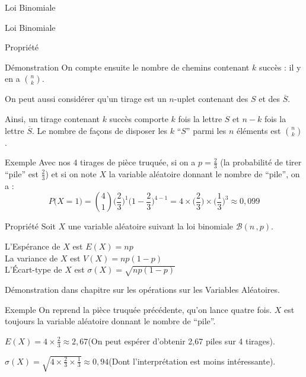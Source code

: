 \documentclass{cours}
\begin{document}
\begin{Gpartie}{Loi Binomiale}
\begin{Spartie}{Loi Binomiale}
\begin{SSpartie}{Propriété}
\begin{SSSpartie}{Démonstration}
                    On compte ensuite le nombre de chemins contenant $k$ succès : il y en a $\binom{n}{k}$.

                    On peut aussi considérer qu'un tirage est un $n$-uplet contenant des $S$ et des $\overline{S}$.

                    Ainsi, un tirage contenant $k$ succès comporte $k$ fois la lettre $S$ et $n-k$ fois la lettre $\overline{S}$. Le nombre de façons de disposer les $k$ ``$S$'' parmi les $n$ éléments est $\binom{n}{k}$.
                \end{SSSpartie}
                \begin{SSSpartie}{Exemple} 
                    Avec nos $4$ tirages de pièce truquée, si on a $p=\frac{2}{3}$ (la probabilité de tirer ``pile'' est $\frac{2}{3}$) et si on note $X$ la variable aléatoire donnant le nombre de ``pile'', on a :
                    \[P\big(X=1\big)=\binom{4}{1}\Bigg(\frac{2}{3}\Bigg)^1\Bigg(1-\frac{2}{3}\Bigg)^{4-1}=4\times\Bigg(\frac{2}{3}\Bigg)\times\Bigg(\frac{1}{3}\Bigg)^3\approx 0{,}099\]
                \end{SSSpartie}
            \end{SSpartie}
            \begin{SSpartie}{Propriété} 
                Soit $X$ une variable aléatoire suivant la loi binomiale $\mathcal{B}(n\,, p)$.

                L'Espérance de $X$ est $E(X)=np$ \\ La variance de $X$ est $V(X)=np(1-p)$ \\ L'Écart-type de $X$ est $\sigma(X)=\sqrt{np(1-p)}$

                Démonstration dans chapitre sur les opérations sur les Variables Aléatoires.
                \begin{SSSpartie}{Exemple} 
                    On reprend la pièce truquée précédente, qu'on lance quatre fois. $X$ est toujours la variable aléatoire donnant le nombre de ``pile''.

                    $E(X)=4\times\frac{2}{3}\approx 2{,}67$\quad (On peut espérer d'obtenir 2{,}67 piles sur 4 tirages).

                    $\sigma(X)=\sqrt{4\times\frac{2}{3}\times\frac{1}{3}}\approx 0{,}94$\quad (Dont l'interprétation est moins intéressante).
                \end{SSSpartie}
            \end{SSpartie}
        \end{Spartie}
    \end{Gpartie}
\end{document}
